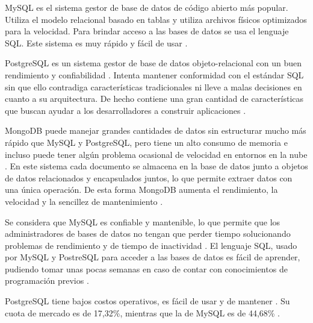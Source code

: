 \documentclass[twoside]{article}
\begin{document}
MySQL es el sistema gestor de base de datos de código abierto más popular. Utiliza el modelo relacional basado en tablas y utiliza archivos físicos optimizados para la velocidad. Para brindar acceso a las bases de datos se usa el lenguaje SQL. Este sistema es muy rápido y fácil de usar \parencite{whatIsMySQLOracle}.

PostgreSQL es un sistema gestor de base de datos objeto-relacional con un buen rendimiento y confiabilidad \parencite{postgreHome}. Intenta mantener conformidad con el estándar SQL sin que ello contradiga características tradicionales ni lleve a malas decisiones en cuanto a su arquitectura. De hecho contiene una gran cantidad de características que buscan ayudar a los desarrolladores a construir aplicaciones \parencite{postgreAbout}.

MongoDB puede manejar grandes cantidades de datos sin estructurar mucho más rápido que MySQL y PostgreSQL, pero tiene un alto consumo de memoria e incluso puede tener algún problema ocasional de velocidad en entornos en la nube \parencite{mongoMysqlComparison}. En este sistema cada documento se almacena en la base de datos junto a objetos de datos relacionados y encapsulados juntos, lo que permite extraer datos con una única operación. De esta forma MongoDB aumenta el rendimiento, la velocidad y la sencillez de mantenimiento \parencite{vsoftconsultingMongo}.

Se considera que MySQL es confiable y mantenible, lo que permite que los administradores de bases de datos no tengan que perder tiempo solucionando problemas de rendimiento y de tiempo de inactividad \parencite{dbquestMysql}. El lenguaje SQL, usado por MySQL y PostreSQL para acceder a las bases de datos es fácil de aprender, pudiendo tomar unas pocas semanas en caso de contar con conocimientos de programación previos \parencite{thinkfulSql}.

PostgreSQL tiene bajos costos operativos, es fácil de usar y de mantener \parencite{topcoderPostgresql}. Su cuota de mercado es de 17,32\%, mientras que la de MySQL es de 44,68\% \parencite{marketShareDb}.
\end{document}
